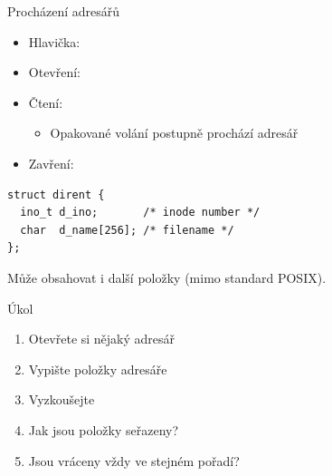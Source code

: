 
\begin{frame}[fragile]{Procházení adresářů}

  \begin{itemize}
    \item Hlavička: 
    \item Otevření: 
    \item Čtení: 
    \begin{itemize}
      \item Opakované volání postupně prochází adresář
    \end{itemize}
    \item Zavření: 
  \end{itemize}

  \begin{block}{}
  \begin{lstlisting}
struct dirent {
  ino_t d_ino;       /* inode number */
  char  d_name[256]; /* filename */
};
  \end{lstlisting}
  Může obsahovat i další položky (mimo standard POSIX).
  \end{block}

\end{frame}

\begin{frame}{Úkol}

  \begin{enumerate}
    \item Otevřete si nějaký adresář
    \item Vypište položky adresáře
    \item Vyzkoušejte
    \item Jak jsou položky seřazeny?
    \item Jsou vráceny vždy ve stejném pořadí?
  \end{enumerate}

\end{frame}

